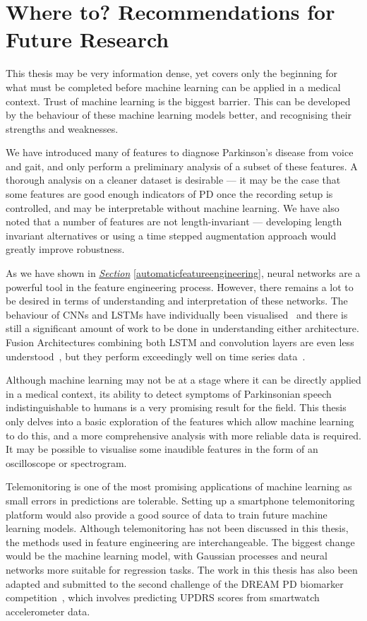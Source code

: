 \documentclass[12pt, twoside]{book}
\renewcommand\emph[1]{\textit{\color{USred}{#1}}}
\begin{document}
\section{Where to? Recommendations for Future Research}

This thesis may be very information dense, yet covers only the beginning for what must be completed before machine learning can be applied in a medical context. Trust of machine learning is the biggest barrier. This can be developed by \emph{understanding} the behaviour of these machine learning models better, and recognising their strengths and weaknesses.

We have introduced many of features to diagnose Parkinson's disease from voice and gait, and only perform a preliminary analysis of a subset of these features. A thorough analysis on a cleaner dataset is desirable --- it may be the case that some features are good enough indicators of PD once the recording setup is controlled, and may be interpretable without machine learning. We have also noted that a number of features are not length-invariant --- developing length invariant alternatives or using a time stepped augmentation approach would greatly improve robustness.

As we have shown in \textit{\hyperref[automaticfeatureengineering]{Section}} \ref{automaticfeatureengineering}, neural networks are a powerful tool in the feature engineering process. However, there remains a lot to be desired in terms of understanding and interpretation of these networks. The behaviour of CNNs and LSTMs have individually been visualised~\cite{cnnvis, visualisernn} and there is still a significant amount of work to be done in understanding either architecture. Fusion Architectures combining both LSTM and convolution layers are even less understood~\cite{LRCN}, but they perform exceedingly well on time series data~\cite{convlstm}. 


Although machine learning may not be at a stage where it can be directly applied in a medical context, its ability to detect symptoms of Parkinsonian speech indistinguishable to humans is a very promising result for the field. This thesis only delves into a basic exploration of the features which allow machine learning to do this, and a more comprehensive analysis with more reliable data is required. It may be possible to visualise some inaudible features in the form of an oscilloscope or spectrogram.

Telemonitoring is one of the most promising applications of machine learning as small errors in predictions are tolerable. Setting up a smartphone telemonitoring platform would also provide a good source of data to train future machine learning models. Although telemonitoring has not been discussed in this thesis, the methods used in feature engineering are interchangeable. The biggest change would be the machine learning model, with Gaussian processes and neural networks more suitable for regression tasks. The work in this thesis has also been adapted and submitted to the second challenge of the DREAM PD biomarker competition~\cite{dreamchallengeinfo}, which involves predicting UPDRS scores from smartwatch accelerometer data.
\end{document}
